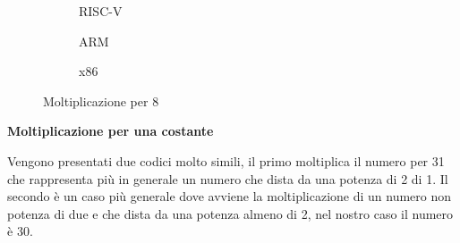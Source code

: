 \documentclass[12pt,a4paper]{report}
\begin{document}
 \begin{figure}
     \begin{subfigure}[b]{0.3\textwidth}
         
          	
		\caption{RISC-V}
		\label{Code:Mul8RISC}
     \end{subfigure}
     \hfill
     \begin{subfigure}[b]{0.3\textwidth}
         
          	
		\caption{ARM}
		\label{Code:Mul8ARM}
     \end{subfigure}
     \hfill
     \begin{subfigure}[b]{0.3\textwidth}
         
          	
		\caption{x86}
		\label{Code:Mul8X86}
     \end{subfigure}
    
        \caption{Moltiplicazione per 8}
        
\end{figure}

\vspace{0.3 cm}

\textbf{Moltiplicazione per una costante}

Vengono presentati due codici molto simili, il primo moltiplica il numero per 31 che rappresenta più in generale un numero che dista da una potenza di 2 di 1. Il secondo è un caso più generale dove avviene la moltiplicazione di un numero non potenza di due e che dista da una potenza almeno di 2, nel nostro caso il numero è 30.

\vspace{0.2 cm }

\begin{figure}
	\begin{subfigure}[b]{0.4\textwidth}
         
          	
		
     \end{subfigure}
     \hfill
     \begin{subfigure}[b]{0.4\textwidth}
         
          	
		
     \end{subfigure}
     
\end{figure}
\end{document}
